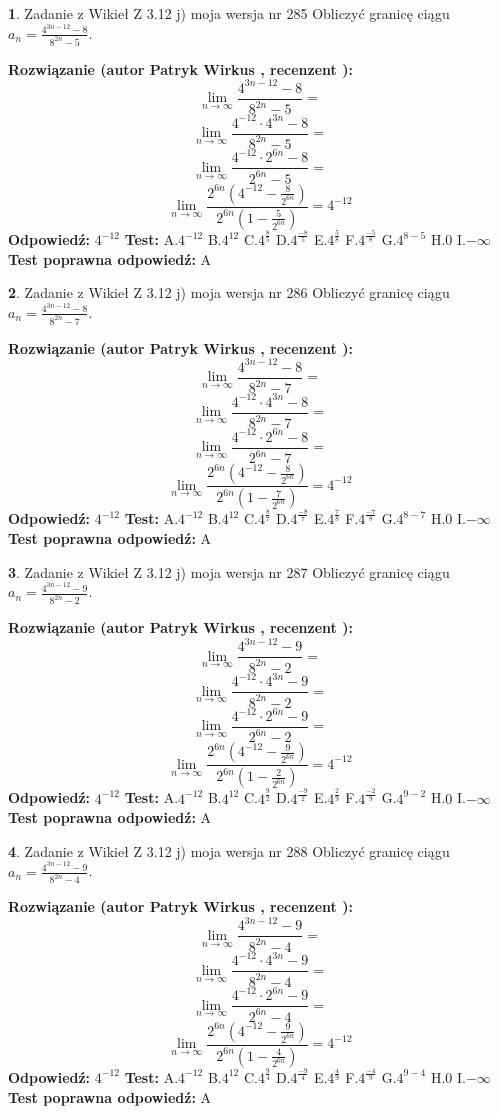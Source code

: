 \documentclass[12pt, a4paper]{article}
\theoremstyle{definition} %
\newtheorem{zad}{}
\newcommand{\zadStart}[1]{\begin{zad}#1\newline}
\newcommand{\zadStop}{\end{zad}}
\newcommand{\rozwStart}[2]{\noindent \textbf{Rozwiązanie (autor #1 , recenzent #2): }\newline}
\newcommand{\rozwStop}{\newline}
\newcommand{\odpStart}{\noindent \textbf{Odpowiedź:}\newline}
\newcommand{\odpStop}{\newline}
\newcommand{\testStart}{\noindent \textbf{Test:}\newline}
\newcommand{\testStop}{\newline}
\newcommand{\kluczStart}{\noindent \textbf{Test poprawna odpowiedź:}\newline}
\newcommand{\kluczStop}{\newline}
\begin{document}
\zadStart{Zadanie z Wikieł Z 3.12 j) moja wersja nr 285}
Obliczyć granicę ciągu $a_{n}=\frac{4^{3n-12}-8}{8^{2n}-5}$.
\zadStop
\rozwStart{Patryk Wirkus}{}
$$\lim\limits_{n\to\infty}\frac{4^{3n-12}-8}{8^{2n}-5}=$$
$$\lim\limits_{n\to\infty}\frac{4^{-12} \cdot 4^{3n}-8}{8^{2n}-5}=$$
$$\lim\limits_{n\to\infty}\frac{4^{-12} \cdot 2^{6n}-8}{2^{6n}-5}=$$
$$\lim\limits_{n\to\infty}\frac{2^{6n}(4^{-12} - \frac{8}{2^{6n}})}{2^{6n}(1-\frac{5}{2^{6n}})}= 4^{-12}$$
\rozwStop
\odpStart
$4^{-12}$
\odpStop
\testStart
A.$4^{-12}$
B.$4^{12}$
C.$4^{\frac{8}{5}}$
D.$4^{\frac{-8}{5}}$
E.$4^{\frac{5}{8}}$
F.$4^{\frac{-5}{8}}$
G.$4^{8-5}$
H.$0$
I.$-\infty$
\testStop
\kluczStart
A
\kluczStop



\zadStart{Zadanie z Wikieł Z 3.12 j) moja wersja nr 286}
Obliczyć granicę ciągu $a_{n}=\frac{4^{3n-12}-8}{8^{2n}-7}$.
\zadStop
\rozwStart{Patryk Wirkus}{}
$$\lim\limits_{n\to\infty}\frac{4^{3n-12}-8}{8^{2n}-7}=$$
$$\lim\limits_{n\to\infty}\frac{4^{-12} \cdot 4^{3n}-8}{8^{2n}-7}=$$
$$\lim\limits_{n\to\infty}\frac{4^{-12} \cdot 2^{6n}-8}{2^{6n}-7}=$$
$$\lim\limits_{n\to\infty}\frac{2^{6n}(4^{-12} - \frac{8}{2^{6n}})}{2^{6n}(1-\frac{7}{2^{6n}})}= 4^{-12}$$
\rozwStop
\odpStart
$4^{-12}$
\odpStop
\testStart
A.$4^{-12}$
B.$4^{12}$
C.$4^{\frac{8}{7}}$
D.$4^{\frac{-8}{7}}$
E.$4^{\frac{7}{8}}$
F.$4^{\frac{-7}{8}}$
G.$4^{8-7}$
H.$0$
I.$-\infty$
\testStop
\kluczStart
A
\kluczStop



\zadStart{Zadanie z Wikieł Z 3.12 j) moja wersja nr 287}
Obliczyć granicę ciągu $a_{n}=\frac{4^{3n-12}-9}{8^{2n}-2}$.
\zadStop
\rozwStart{Patryk Wirkus}{}
$$\lim\limits_{n\to\infty}\frac{4^{3n-12}-9}{8^{2n}-2}=$$
$$\lim\limits_{n\to\infty}\frac{4^{-12} \cdot 4^{3n}-9}{8^{2n}-2}=$$
$$\lim\limits_{n\to\infty}\frac{4^{-12} \cdot 2^{6n}-9}{2^{6n}-2}=$$
$$\lim\limits_{n\to\infty}\frac{2^{6n}(4^{-12} - \frac{9}{2^{6n}})}{2^{6n}(1-\frac{2}{2^{6n}})}= 4^{-12}$$
\rozwStop
\odpStart
$4^{-12}$
\odpStop
\testStart
A.$4^{-12}$
B.$4^{12}$
C.$4^{\frac{9}{2}}$
D.$4^{\frac{-9}{2}}$
E.$4^{\frac{2}{9}}$
F.$4^{\frac{-2}{9}}$
G.$4^{9-2}$
H.$0$
I.$-\infty$
\testStop
\kluczStart
A
\kluczStop



\zadStart{Zadanie z Wikieł Z 3.12 j) moja wersja nr 288}
Obliczyć granicę ciągu $a_{n}=\frac{4^{3n-12}-9}{8^{2n}-4}$.
\zadStop
\rozwStart{Patryk Wirkus}{}
$$\lim\limits_{n\to\infty}\frac{4^{3n-12}-9}{8^{2n}-4}=$$
$$\lim\limits_{n\to\infty}\frac{4^{-12} \cdot 4^{3n}-9}{8^{2n}-4}=$$
$$\lim\limits_{n\to\infty}\frac{4^{-12} \cdot 2^{6n}-9}{2^{6n}-4}=$$
$$\lim\limits_{n\to\infty}\frac{2^{6n}(4^{-12} - \frac{9}{2^{6n}})}{2^{6n}(1-\frac{4}{2^{6n}})}= 4^{-12}$$
\rozwStop
\odpStart
$4^{-12}$
\odpStop
\testStart
A.$4^{-12}$
B.$4^{12}$
C.$4^{\frac{9}{4}}$
D.$4^{\frac{-9}{4}}$
E.$4^{\frac{4}{9}}$
F.$4^{\frac{-4}{9}}$
G.$4^{9-4}$
H.$0$
I.$-\infty$
\testStop
\kluczStart
A
\kluczStop
\end{document}
